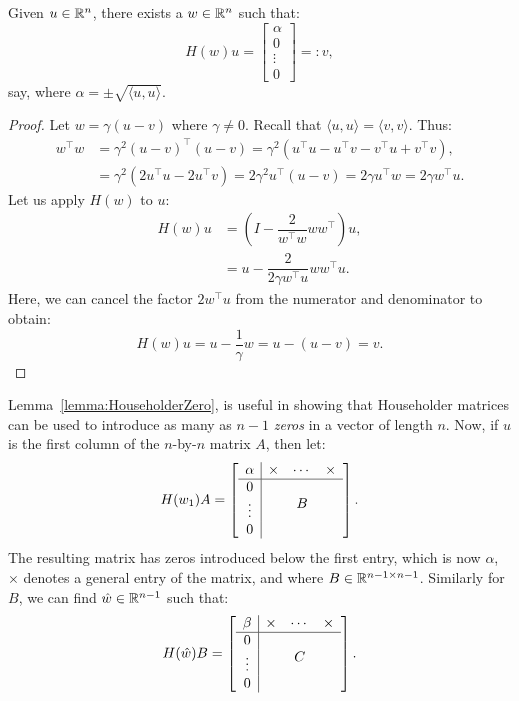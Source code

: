 \begin{lemma}\label{lemma:HouseholderZero}
Given $u\in\mathbb{R}^n$, there exists a $w\in\mathbb{R}^n$ such that:
\[
H(w)u = \begin{bmatrix} \alpha\\ 0\\ \vdots\\0\end{bmatrix} =: v,
\]
say, where $\alpha = \pm\sqrt{\langle u,u\rangle}$.
\end{lemma}
\begin{proof}
Let $w = \gamma(u-v)$ where $\gamma\ne0$. Recall that $\langle u,u\rangle = \langle v,v\rangle$. Thus:
\begin{align*}
w^\top w & = \gamma^2(u-v)^\top(u-v) = \gamma^2(u^\top u - u^\top v - v^\top u + v^\top v),\\
& = \gamma^2(2u^\top u -2u^\top v) = 2\gamma^2u^\top(u-v) = 2\gamma u^\top w = 2\gamma w^\top u.
\end{align*}
Let us apply $H(w)$ to $u$:
\begin{align*}
H(w)u & = \left(I-\dfrac{2}{w^\top w}ww^\top\right)u,\\
& = u - \dfrac{2}{2\gamma w^\top u} w w^\top u.
\end{align*}
Here, we can cancel the factor $2w^\top u$ from the numerator and denominator to obtain:
\[
H(w)u = u - \dfrac{1}{\gamma}w = u - (u-v) = v.
\]
\end{proof}
Lemma~\ref{lemma:HouseholderZero}, is useful in showing that Householder matrices can be used to introduce as many as $n-1$ {\em zeros} in a vector of length $n$. 
Now, if $u$ is the first column of the $n$-by-$n$ matrix $A$, then let:
\[
H(w_1)A = \left[\begin{array}{c|ccc} \alpha & \times & \cdots & \times\\ \hline 0 & \multicolumn{3}{c}{\multirow{3}{*}{$B$}}\\ \vdots\\0\\ \end{array}\right].
\]
The resulting matrix has zeros introduced below the first entry, which is now $\alpha$, $\times$ denotes a general entry of the matrix, and where $B\in\mathbb{R}^{n-1\times n-1}$. Similarly for $B$, we can find $\hat{w}\in\mathbb{R}^{n-1}$ such that:
\[
H(\hat{w})B = \left[\begin{array}{c|ccc} \beta & \times & \cdots & \times\\ \hline 0 & \multicolumn{3}{c}{\multirow{3}{*}{$C$}}\\ \vdots\\0\\ \end{array}\right].
\]
